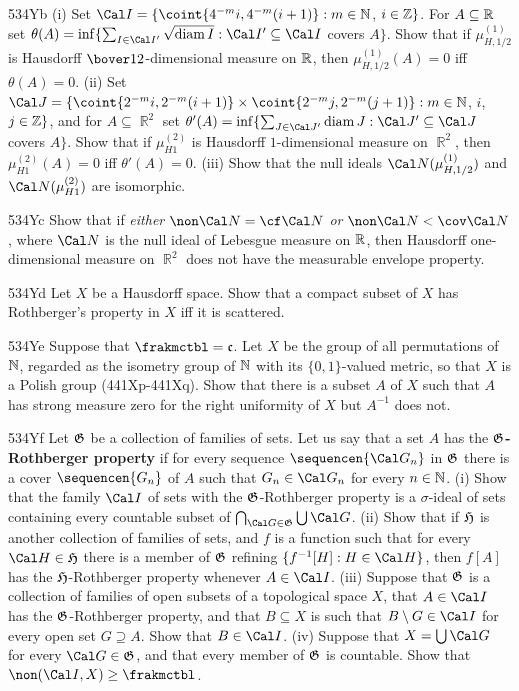 {\spheader 534Yb (i) Set
$\Cal I=\{\coint{4^{-m}i,4^{-m}(i+1)}:m\in\Bbb N$, $i\in\Bbb Z\}$.   For
$A\subseteq\Bbb R$ set
$\theta(A)=\inf\{\sum_{I\in\Cal I'}\sqrt{\diam I}:
\Cal I'\subseteq\Cal I$ covers $A\}$.
Show that if $\mu^{(1)}_{H,1/2}$ is Hausdorff $\bover12$-dimensional
measure on $\Bbb R$, then $\mu^{(1)}_{H,1/2}(A)=0$ iff $\theta(A)=0$.
(ii) Set $\Cal J
=\{\coint{2^{-m}i,2^{-m}(i+1)}\times\coint{2^{-m}j,2^{-m}(j+1)}:
  m\in\Bbb N$, $i$, $j\in\Bbb Z\}$, and for $A\subseteq\BbbR^2$ set
$\theta'(A)=\inf\{\sum_{J\in\Cal J'}\diam J:\Cal J'\subseteq\Cal J$
covers $A\}$.
Show that if $\mu^{(2)}_{H1}$ is Hausdorff $1$-dimensional measure on
$\BbbR^2$, then $\mu^{(2)}_{H1}(A)=0$ iff $\theta'(A)=0$.
(iii) Show that the null ideals $\Cal N(\mu^{(1)}_{H,1/2})$ and
$\Cal N(\mu^{(2)}_{H1})$ are isomorphic.

\spheader 534Yc Show that if {\it either}
$\non\Cal N=\cf\Cal N$ {\it or} $\non\Cal N<\cov\Cal N$, where $\Cal N$ is
the null ideal of Lebesgue measure on $\Bbb R$,
then Hausdorff one-dimensional measure on $\BbbR^2$ does not have the
measurable envelope property.

\spheader 534Yd Let $X$ be a Hausdorff space.   Show that a compact
subset of $X$ has Rothberger's property in $X$ iff it is scattered.

\spheader 534Ye Suppose that $\frakmctbl=\frak c$.   Let $X$ be the
group of all permutations of $\Bbb N$, regarded as the isometry group of
$\Bbb N$ with its $\{0,1\}$-valued metric, so that $X$ is a Polish group
(441Xp-441Xq).   Show that there is a subset $A$ of $X$ such that $A$
has strong measure zero for the right uniformity of $X$ but $A^{-1}$
does not.

\spheader 534Yf
Let $\frak G$ be a collection of families of sets.   Let us say that a
set $A$ has the
{\bf $\frak G$-Rothberger property} if for every sequence
$\sequencen{\Cal G_n}$ in $\frak G$ there is a cover $\sequencen{G_n}$
of $A$ such that $G_n\in\Cal G_n$ for every $n\in\Bbb N$.   (i) Show
that the family $\Cal I$ of sets with the $\frak G$-Rothberger
property
is a $\sigma$-ideal of sets containing every countable subset of
$\bigcap_{\Cal G\in\frak G}\bigcup\Cal G$.
(ii) Show that if $\frak H$ is another collection of families of sets,
and $f$ is a function such that for every $\Cal H\in\frak H$ there is
a member of $\frak G$ refining $\{f^{-1}[H]:H\in\Cal H\}$, then $f[A]$
has the $\frak H$-Rothberger property whenever $A\in\Cal I$.   (iii)
Suppose that $\frak G$ is a collection of families of open subsets of a
topological space  $X$, that $A\in\Cal I$ has the
$\frak G$-Rothberger property, and that $B\subseteq X$ is such that
$B\setminus G\in\Cal I$ for every open set $G\supseteq A$.   Show that
$B\in\Cal I$.   (iv) Suppose that $X=\bigcup\Cal G$ for every
$\Cal G\in\frak G$, and that every member of $\frak G$ is countable.
Show that $\non(\Cal I,X)\ge\frakmctbl$.

}
